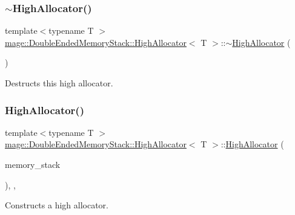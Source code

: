 \subsubsection{\texorpdfstring{$\sim$\+High\+Allocator()}{~HighAllocator()}}
{\footnotesize\ttfamily template$<$typename T $>$ \\
\mbox{\hyperlink{classmage_1_1_double_ended_memory_stack_1_1_high_allocator}{mage\+::\+Double\+Ended\+Memory\+Stack\+::\+High\+Allocator}}$<$ T $>$\+::$\sim$\mbox{\hyperlink{classmage_1_1_double_ended_memory_stack_1_1_high_allocator}{High\+Allocator}} (\begin{DoxyParamCaption}{ }\end{DoxyParamCaption})\hspace{0.3cm}{\ttfamily [default]}}

Destructs this high allocator. \mbox{\label{classmage_1_1_double_ended_memory_stack_1_1_high_allocator_a4be3d4cac75c3bd8088d47c0ec06cf11}} 
\subsubsection{\texorpdfstring{High\+Allocator()}{HighAllocator()}\hspace{0.1cm}{\footnotesize\ttfamily [4/4]}}
{\footnotesize\ttfamily template$<$typename T $>$ \\
\mbox{\hyperlink{classmage_1_1_double_ended_memory_stack_1_1_high_allocator}{mage\+::\+Double\+Ended\+Memory\+Stack\+::\+High\+Allocator}}$<$ T $>$\+::\mbox{\hyperlink{classmage_1_1_double_ended_memory_stack_1_1_high_allocator}{High\+Allocator}} (\begin{DoxyParamCaption}\item[{\mbox{\hyperlink{namespacemage_a8769f9d670d6b585ea306cb1062af94b}{Not\+Null}}$<$ \mbox{\hyperlink{classmage_1_1_double_ended_memory_stack}{Double\+Ended\+Memory\+Stack}} $\ast$ $>$}]{memory\+\_\+stack }\end{DoxyParamCaption})\hspace{0.3cm}{\ttfamily [explicit]}, {\ttfamily [private]}, {\ttfamily [noexcept]}}

Constructs a high allocator.



